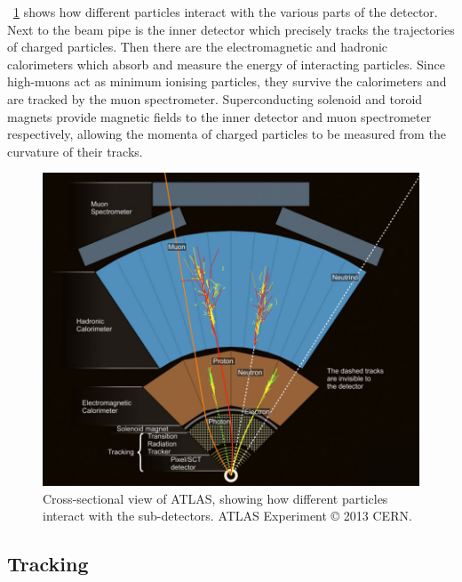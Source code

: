 \Figure~\ref{fig:atlas_wedge} shows how different particles interact with the various 
parts of the detector. Next to the beam pipe is the inner detector which precisely tracks 
the trajectories of charged particles. Then there are the electromagnetic and hadronic 
calorimeters which absorb and measure the energy of interacting particles. Since 
high-\pt muons act as minimum ionising particles, they survive the calorimeters and are 
tracked by the muon spectrometer. Superconducting solenoid and toroid magnets provide 
magnetic fields to the inner detector and muon spectrometer respectively, allowing the 
momenta of charged particles to be measured from the curvature of their tracks.

\begin{figure}[t]
	\includegraphics[width=0.98\largefigwidth]{tex/experiment/atlas_wedge}
	\caption{Cross-sectional view of ATLAS, showing how different particles interact with 
	the sub-detectors. ATLAS Experiment \copyright\xspace 2013 CERN.}
	\label{fig:atlas_wedge}
\end{figure}



\subsection{Tracking}
\label{sec:atlas:id}

